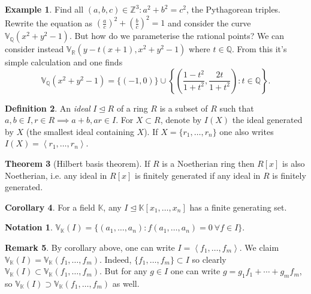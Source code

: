 \documentclass{article}
\newcommand{\Z}{\mathbb{Z}}
\newcommand{\Q}{\mathbb{Q}}
\newcommand{\R}{\mathbb{R}}
\newcommand{\K}{\mathbb{K}}
\newcommand{\V}{\mathbb{V}}
\newcommand{\la}{\left\langle}
\newcommand{\ra}{\right\rangle}
\theoremstyle{definition}
\newtheorem{defn}{Definition}[subsection]
\newtheorem{thm}[defn]{Theorem}
\newtheorem{coro}[defn]{Corollary}
\newtheorem{example}[defn]{Example}
\newtheorem{remark}[defn]{Remark}
\newtheorem*{notation}{Notation}
\begin{document}
\begin{example}
Find all $(a,b,c)\in\Z^3:a^2+b^2=c^2$, the Pythagorean triples. Rewrite the equation as $\left(\frac{a}{c}\right)^2+\left(\frac{b}{c}\right)^2=1$ and consider the curve $\V_\Q(x^2+y^2-1)$. But how do we parameterise the rational points? We can consider instead $\V_\R(y-t(x+1),x^2+y^2-1)$ where $t\in\Q$. From this it's simple calculation and one finds
\[
\V_\Q(x^2+y^2-1)=\{(-1,0)\}\cup\left\{\left(\frac{1-t^2}{1+t^2},\frac{2t}{1+t^2}\right):t\in\Q\right\}.
\]

\begin{center}
\end{center}
\end{example}

\begin{defn}
An \textit{ideal} $I\unlhd R$ of a ring $R$ is a subset of $R$ such that $a,b\in I,r\in R\implies a+b,ar\in I$. For $X\subset R$, denote by $I(X)$ the ideal generated by $X$ (the smallest ideal containing $X$). If $X=\{r_1,\ldots,r_n\}$ one also writes $I(X)=\la r_1,\ldots,r_n\ra$.
\end{defn}

\begin{thm}[Hilbert basis theorem]
\label{thm:Hilbertbasis}
If $R$ is a Noetherian ring then $R[x]$ is also Noetherian, i.e. any ideal in $R[x]$ is finitely generated if any ideal in $R$ is finitely generated.
\end{thm}

\begin{coro}
For a field $\K$, any $I\unlhd\K[x_1,\ldots,x_n]$ has a finite generating set.
\end{coro}

\begin{notation}
$\V_\K(I)=\{(a_1,\ldots,a_n):f(a_1,\ldots,a_n)=0 \ \forall f\in I\}$.
\end{notation}
\begin{remark}
By corollary above, one can write $I=\la f_1,\ldots,f_m\ra$. We claim $\V_\K(I)=\V_\K(f_1,\ldots, f_m)$. Indeed, $\{f_1,\ldots,f_m\}\subset I$ so clearly $\V_\K(I)\subset\V_\K(f_1,\ldots,f_m)$. But for any $g\in I$ one can write $g=g_1f_1+\cdots+g_mf_m$, so $\V_\K(I)\supset\V_\K(f_1,\ldots,f_m)$ as well.
\end{remark}
\end{document}
